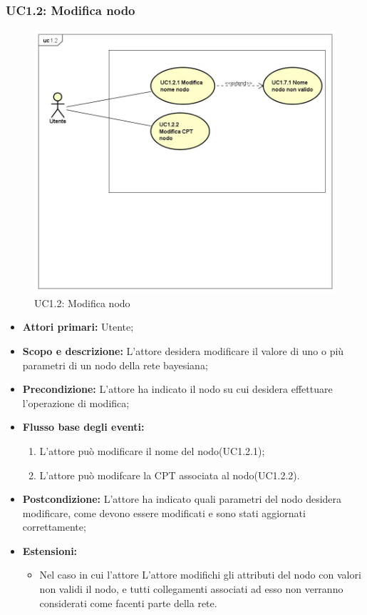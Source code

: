 \subsubsection{UC1.2: Modifica nodo} 
\begin{figure} [H]
	\centering
	\includegraphics[scale=0.45]{Img/UC1-2} 
	\caption{UC1.2: Modifica nodo} \label{} 
\end{figure} 
\begin{itemize} 
	\item{\textbf{Attori primari:} Utente;} 
	\item{\textbf{Scopo e descrizione:} L'attore desidera modificare il valore di uno o più parametri di un nodo della rete bayesiana;} 
	\item{\textbf{Precondizione:} L'attore ha indicato il nodo su cui desidera effettuare l'operazione di modifica;} 
	\item{\textbf{Flusso base degli eventi:} } 
		\begin{enumerate} 
			\item{L'attore può modificare il nome del nodo(UC1.2.1);} 
			\item{L'attore può modifcare la CPT associata al nodo(UC1.2.2).} 		
		\end{enumerate} 
	\item{\textbf{Postcondizione:} L'attore ha indicato quali parametri del nodo desidera modificare, come devono essere modificati e sono stati aggiornati correttamente;} 
	\item{\textbf{Estensioni:} } 
		\begin{itemize} 
			\item{Nel caso in cui l'attore L'attore modifichi gli attributi del nodo con valori non validi il nodo, e tutti collegamenti associati ad esso non verranno considerati come facenti parte della rete.} 
		\end{itemize} 
\end{itemize} 

